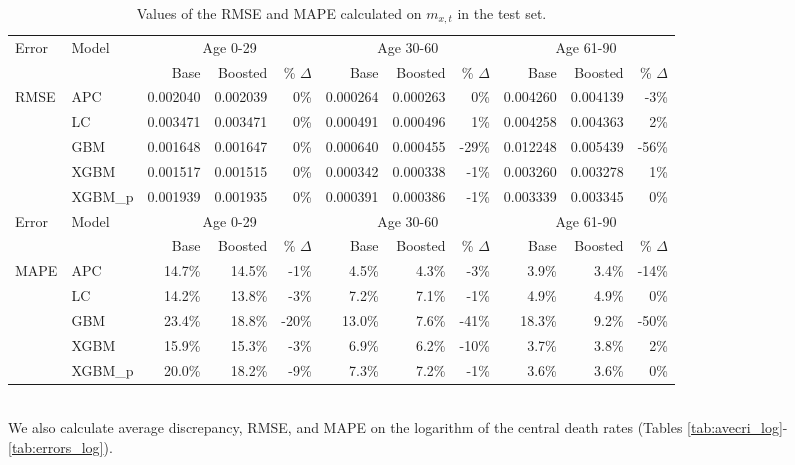 \documentclass[a4,11pt]{article}
\begin{document}
\begin{table}[ht]
\centering
\scriptsize
\begin{tabular}{|l|l|r|r|r|r|r|r|r|r|r|}
\hline
\multirow{2}{*}{Error} & \multirow{2}{*}{Model} & \multicolumn{3}{c|}{Age 0-29} & \multicolumn{3}{c|}{Age 30-60} & \multicolumn{3}{c|}{Age 61-90} \\
\cline{3-11}
&			&	Base 	&	Boosted 	& \% $\Delta$ &	Base 	&	Boosted 	& \% $\Delta$ &	Base 	&	Boosted	& \% $\Delta$\\
\hline
\multirow{5}{*}{RMSE}  & APC 	&	0.002040	&	0.002039	&	0\%	&	0.000264	&	0.000263	&	0\%	&	0.004260	&	0.004139	&	-3\%	\\
& LC 	&	0.003471	&	0.003471	&	0\%	&	0.000491	&	0.000496	&	1\%	&	0.004258	&	0.004363	&	2\%	\\
& GBM 	&	0.001648	&	0.001647	&	0\%	&	0.000640	&	0.000455	&	-29\%	&	0.012248	&	0.005439	&	-56\%	\\
& XGBM 	&	0.001517	&	0.001515	&	0\%	&	0.000342	&	0.000338	&	-1\%	&	0.003260	&	0.003278	&	1\%	\\
& XGBM\_p 	&	0.001939	&	0.001935	&	0\%	&	0.000391	&	0.000386	&	-1\%	&	0.003339	&	0.003345	&	0\%	\\
\hline
\multirow{2}{*}{Error} & \multirow{2}{*}{Model} & \multicolumn{3}{c|}{Age 0-29} & \multicolumn{3}{c|}{Age 30-60} & \multicolumn{3}{c|}{Age 61-90} \\
\cline{3-11}
&			&	Base 	&	Boosted 	& \% $\Delta$ &	Base 	&	Boosted 	& \% $\Delta$ &	Base 	&	Boosted	& \% $\Delta$\\
\hline
\multirow{5}{*}{MAPE}  & APC 			&	14.7\%	&	14.5\%	&	-1\%		&	4.5\%	&	4.3\%	&	-3\%		&	3.9\%	&	3.4\%	&	-14\% \\
& LC 			&	14.2\%	&	13.8\%	&	-3\%		&	7.2\%	&	7.1\%	&	-1\%		&	4.9\%	&	4.9\%	&	0\%	\\
& GBM 		&	23.4\%	&	18.8\%	&	-20\%	&	13.0\%	&	7.6\%	&	-41\%	&	18.3\%	&	9.2\%	&	-50\% \\
& XGBM 		&	15.9\%	&	15.3\%	&	-3\%		&	6.9\%	&	6.2\%	&	-10\%	&	3.7\%	&	3.8\%	&	2\%	\\
& XGBM\_p 	&	20.0\%	&	18.2\%	&	-9\%		&	7.3\%	&	7.2\%	&	-1\%		&	3.6\%	&	3.6\%	&	0\%	\\
\hline
\end{tabular}
\caption{Values of the RMSE and MAPE calculated on $m_{x,t}$ in the test set.}
\label{tab:errors}
\end{table}\\
%
We also calculate average discrepancy, RMSE, and MAPE on the logarithm of the central death rates (Tables \ref{tab:avecri_log}-\ref{tab:errors_log}). 
\end{document}
